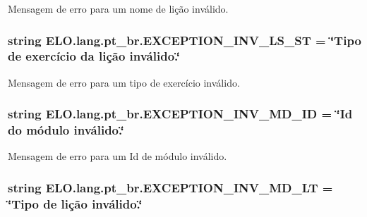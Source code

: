 Mensagem de erro para um nome de lição inválido. 

\hypertarget{namespaceELO_1_1lang_1_1pt__br_a17ad35af02ab988d2ce5218b0b4b16d1}{
\subsubsection[{E\-X\-C\-E\-P\-T\-I\-O\-N\-\_\-\-I\-N\-V\-\_\-\-L\-S\-\_\-\-S\-T}]{\setlength{\rightskip}{0pt plus 5cm}string E\-L\-O.\-lang.\-pt\-\_\-br.\-E\-X\-C\-E\-P\-T\-I\-O\-N\-\_\-\-I\-N\-V\-\_\-\-L\-S\-\_\-\-S\-T = \char`\"{}Tipo de exercício da lição inválido.\char`\"{}}}\label{d5/d70/namespaceELO_1_1lang_1_1pt__br_a17ad35af02ab988d2ce5218b0b4b16d1}


Mensagem de erro para um tipo de exercício inválido. 

\hypertarget{namespaceELO_1_1lang_1_1pt__br_a872dcdcb3db33175e29767d824e793dc}{
\subsubsection[{E\-X\-C\-E\-P\-T\-I\-O\-N\-\_\-\-I\-N\-V\-\_\-\-M\-D\-\_\-\-I\-D}]{\setlength{\rightskip}{0pt plus 5cm}string E\-L\-O.\-lang.\-pt\-\_\-br.\-E\-X\-C\-E\-P\-T\-I\-O\-N\-\_\-\-I\-N\-V\-\_\-\-M\-D\-\_\-\-I\-D = \char`\"{}Id do módulo inválido.\char`\"{}}}\label{d5/d70/namespaceELO_1_1lang_1_1pt__br_a872dcdcb3db33175e29767d824e793dc}


Mensagem de erro para um Id de módulo inválido. 

\hypertarget{namespaceELO_1_1lang_1_1pt__br_af8ca0e427b35f18491bbe38c779364be}{
\subsubsection[{E\-X\-C\-E\-P\-T\-I\-O\-N\-\_\-\-I\-N\-V\-\_\-\-M\-D\-\_\-\-L\-T}]{\setlength{\rightskip}{0pt plus 5cm}string E\-L\-O.\-lang.\-pt\-\_\-br.\-E\-X\-C\-E\-P\-T\-I\-O\-N\-\_\-\-I\-N\-V\-\_\-\-M\-D\-\_\-\-L\-T = \char`\"{}Tipo de lição inválido.\char`\"{}}}\label{d5/d70/namespaceELO_1_1lang_1_1pt__br_af8ca0e427b35f18491bbe38c779364be}


